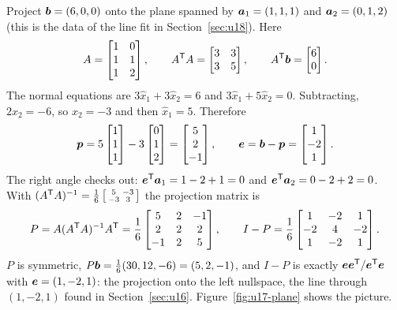 \begin{example}\label{ex:u17-plane}
Project $\boldsymbol{b}=(6,0,0)$ onto the plane spanned by $\boldsymbol{a}_1=(1,1,1)$ and $\boldsymbol{a}_2=(0,1,2)$
(this is the data of the line fit in Section~\ref{sec:u18}). Here
\[
  A=\begin{bmatrix}1&0\\1&1\\1&2\end{bmatrix},\qquad
  A^{\mathsf{T}} A=\begin{bmatrix}3&3\\3&5\end{bmatrix},\qquad
  A^{\mathsf{T}}\boldsymbol{b}=\begin{bmatrix}6\\0\end{bmatrix}.
\]
The normal equations are $3\hat{x}_1+3\hat{x}_2=6$ and $3\hat{x}_1+5\hat{x}_2=0$. Subtracting,
$2\hat{x}_2=-6$, so $\hat{x}_2=-3$ and then $\hat{x}_1=5$. Therefore
\[
  \boldsymbol{p}=5\begin{bmatrix}1\\1\\1\end{bmatrix}-3\begin{bmatrix}0\\1\\2\end{bmatrix}
  =\begin{bmatrix}5\\2\\-1\end{bmatrix},\qquad
  \boldsymbol{e}=\boldsymbol{b}-\boldsymbol{p}=\begin{bmatrix}1\\-2\\1\end{bmatrix}.
\]
The right angle checks out: $\boldsymbol{e}^{\mathsf{T}}\boldsymbol{a}_1=1-2+1=0$ and $\boldsymbol{e}^{\mathsf{T}}\boldsymbol{a}_2=0-2+2=0$. With
$(A^{\mathsf{T}} A)^{-1}=\frac16\left[\begin{smallmatrix}5&-3\\-3&3\end{smallmatrix}\right]$ the
projection matrix is
\[
  P=A(A^{\mathsf{T}} A)^{-1}A^{\mathsf{T}}=\frac16\begin{bmatrix}5&2&-1\\2&2&2\\-1&2&5\end{bmatrix},
  \qquad
  I-P=\frac16\begin{bmatrix}1&-2&1\\-2&4&-2\\1&-2&1\end{bmatrix}.
\]
$P$ is symmetric, $P\boldsymbol{b}=\frac16(30,12,-6)=(5,2,-1)$, and $I-P$ is exactly
$\boldsymbol{e}\boldsymbol{e}^{\mathsf{T}}/\boldsymbol{e}^{\mathsf{T}}\boldsymbol{e}$ with $\boldsymbol{e}=(1,-2,1)$: the projection onto the left
nullspace, the line through $(1,-2,1)$ found in Section~\ref{sec:u16}.
Figure~\ref{fig:u17-plane} shows the picture.
\end{example}

